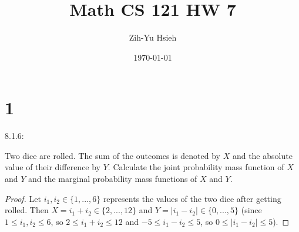 \documentclass{article}
\title{Math CS 121 HW 7}
\author{Zih-Yu Hsieh}
\date{\today}
\begin{document}
\maketitle

\section*{1}
\begin{ques}\label{q1}
    8.1.6:

    Two dice are rolled. The sum of the outcomes is denoted by $X$ and the absolute value of their difference by $Y$. Calculate the joint probability mass function of $X$ and $Y$ and the marginal probability mass functions of $X$ and $Y$.
\end{ques}

\begin{proof}
    Let $i_1,i_2\in\{1,...,6\}$ represents the values of the two dice after getting rolled. Then $X = i_1+i_2\in\{2,...,12\}$ and $Y=|i_1-i_2|\in\{0,...,5\}$ (since $1\leq i_1,i_2\leq 6$, so $2\leq i_1+i_2\leq 12$ and $-5\leq i_1-i_2\leq 5$, so $0\leq |i_1-i_2|\leq 5$).


\end{proof}
\end{document}
